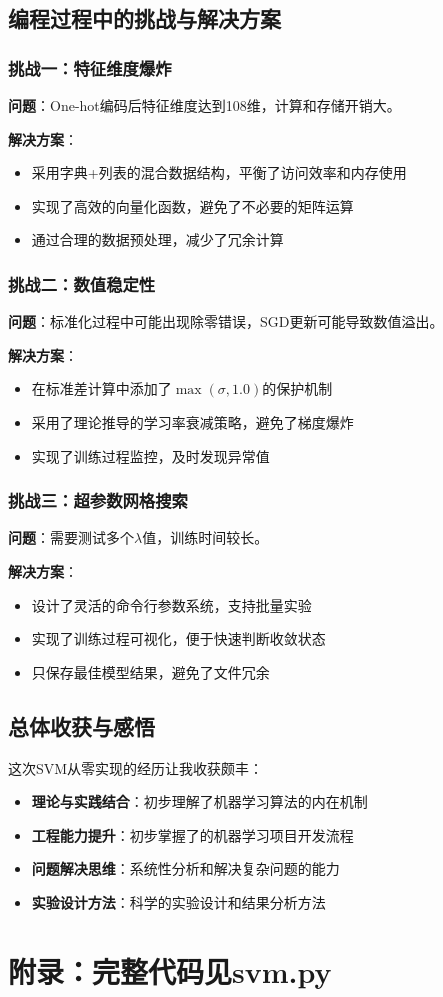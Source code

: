 \documentclass[a4paper]{article}
\begin{document}
\subsection{编程过程中的挑战与解决方案}

\subsubsection{挑战一：特征维度爆炸}
\textbf{问题}：One-hot编码后特征维度达到108维，计算和存储开销大。

\textbf{解决方案}：
\begin{itemize}
    \item 采用字典+列表的混合数据结构，平衡了访问效率和内存使用
    \item 实现了高效的向量化函数，避免了不必要的矩阵运算
    \item 通过合理的数据预处理，减少了冗余计算
\end{itemize}

\subsubsection{挑战二：数值稳定性}
\textbf{问题}：标准化过程中可能出现除零错误，SGD更新可能导致数值溢出。

\textbf{解决方案}：
\begin{itemize}
    \item 在标准差计算中添加了$\max(\sigma, 1.0)$的保护机制
    \item 采用了理论推导的学习率衰减策略，避免了梯度爆炸
    \item 实现了训练过程监控，及时发现异常值
\end{itemize}

\subsubsection{挑战三：超参数网格搜索}
\textbf{问题}：需要测试多个$\lambda$值，训练时间较长。

\textbf{解决方案}：
\begin{itemize}
    \item 设计了灵活的命令行参数系统，支持批量实验
    \item 实现了训练过程可视化，便于快速判断收敛状态  
    \item 只保存最佳模型结果，避免了文件冗余
\end{itemize}

\subsection{总体收获与感悟}

这次SVM从零实现的经历让我收获颇丰：

\begin{itemize}
    \item \textbf{理论与实践结合}：初步理解了机器学习算法的内在机制
    \item \textbf{工程能力提升}：初步掌握了的机器学习项目开发流程
    \item \textbf{问题解决思维}：系统性分析和解决复杂问题的能力
    \item \textbf{实验设计方法}：科学的实验设计和结果分析方法
\end{itemize}

\section*{附录：完整代码见svm.py}
\end{document}
